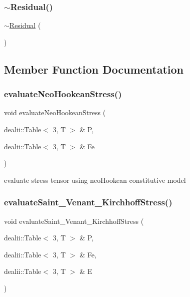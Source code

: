 \mbox{\label{class_residual_a8eef8c757003dd763b7dddc733f65641}} 
\subsubsection{\texorpdfstring{$\sim$Residual()}{~Residual()}}
{\footnotesize\ttfamily $\sim$\mbox{\hyperlink{class_residual}{Residual}} (\begin{DoxyParamCaption}{ }\end{DoxyParamCaption})}



\subsection{Member Function Documentation}
\mbox{\label{class_residual_a0f9ff6a237d377803ce368b26ca39652}} 
\subsubsection{\texorpdfstring{evaluateNeoHookeanStress()}{evaluateNeoHookeanStress()}}
{\footnotesize\ttfamily void evaluate\+Neo\+Hookean\+Stress (\begin{DoxyParamCaption}\item[{dealii\+::\+Table$<$ 3, T $>$ \&}]{P,  }\item[{dealii\+::\+Table$<$ 3, T $>$ \&}]{Fe }\end{DoxyParamCaption})}

evaluate stress tensor using neo\+Hookean constitutive model \mbox{\label{class_residual_a4215ec5a6eabd7573e0caeee6fd194ad}} 
\subsubsection{\texorpdfstring{evaluateSaint\_Venant\_KirchhoffStress()}{evaluateSaint\_Venant\_KirchhoffStress()}}
{\footnotesize\ttfamily void evaluate\+Saint\+\_\+\+Venant\+\_\+\+Kirchhoff\+Stress (\begin{DoxyParamCaption}\item[{dealii\+::\+Table$<$ 3, T $>$ \&}]{P,  }\item[{dealii\+::\+Table$<$ 3, T $>$ \&}]{Fe,  }\item[{dealii\+::\+Table$<$ 3, T $>$ \&}]{E }\end{DoxyParamCaption})}

